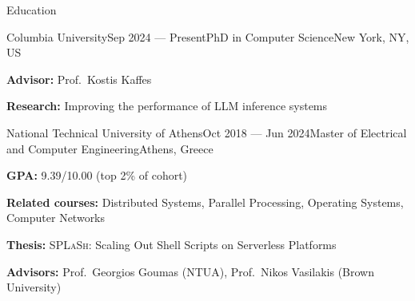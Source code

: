 \documentclass[letterpaper, 12pt]{resume}
\begin{document}

\begin{rSection}{Education}
    \begin{rSubsection}{Columbia University}{Sep 2024 --- Present}{PhD in Computer Science}{New York, NY, US}
        \item \textbf{Advisor:} Prof.\ Kostis Kaffes
        \item \textbf{Research:} Improving the performance of LLM inference systems
    \end{rSubsection}

    \begin{rSubsection}{National Technical University of Athens}{Oct 2018 --- Jun 2024}{Master of Electrical and Computer Engineering}{Athens, Greece}
        \item \textbf{GPA:} 9.39/10.00 (top 2\% of cohort)
        \item \textbf{Related courses:} Distributed Systems, Parallel Processing, Operating Systems, Computer Networks
        \item \textbf{Thesis:} \textsc{SPLaSh}: Scaling Out Shell Scripts on Serverless Platforms
        \item \textbf{Advisors:} Prof.\ Georgios Goumas (NTUA), Prof.\ Nikos Vasilakis (Brown University)
    \end{rSubsection}
\end{rSection}
\end{document}
